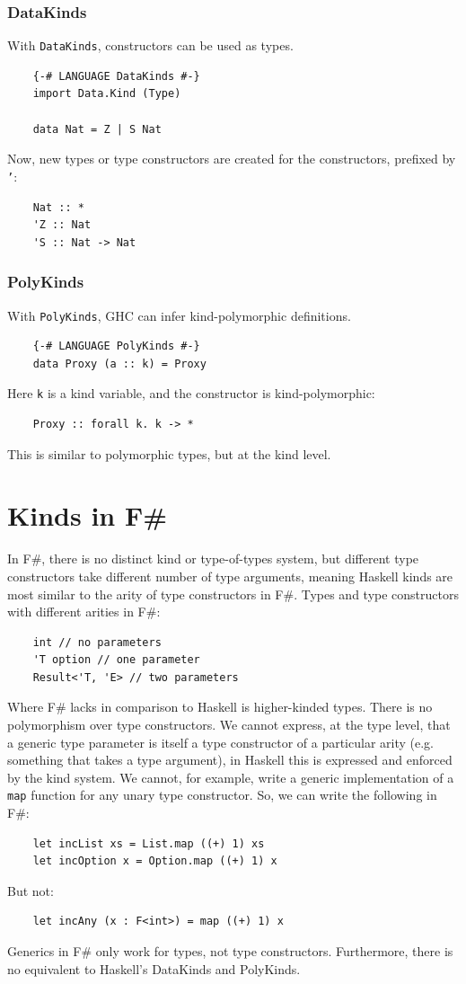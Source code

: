 \documentclass[12pt,oneside,a4paper]{article}
\begin{document}
\subsubsection*{DataKinds}
With \texttt{DataKinds}, constructors can be used as types.
\begin{lstlisting}
    {-# LANGUAGE DataKinds #-}
    import Data.Kind (Type)

    data Nat = Z | S Nat
\end{lstlisting}
Now, new types or type constructors are created for the constructors, prefixed by \texttt{'}:
\begin{lstlisting}
    Nat :: *
    'Z :: Nat
    'S :: Nat -> Nat
\end{lstlisting}
\subsubsection*{PolyKinds}
With \texttt{PolyKinds}, GHC can infer kind-polymorphic definitions.
\begin{lstlisting}
    {-# LANGUAGE PolyKinds #-}
    data Proxy (a :: k) = Proxy
\end{lstlisting}
Here \texttt{k} is a kind variable, and the constructor is kind-polymorphic:
\begin{lstlisting}
    Proxy :: forall k. k -> *
\end{lstlisting}
This is similar to polymorphic types, but at the kind level.


\section{Kinds in F\#}
In F\#, there is no distinct kind or type-of-types system, but different type constructors take different number of type arguments, meaning Haskell kinds are most similar to the arity of type constructors in F\#. Types and type constructors with different arities in F\#:
\begin{lstlisting}
    int // no parameters
    'T option // one parameter
    Result<'T, 'E> // two parameters
\end{lstlisting}
Where F\# lacks in comparison to Haskell is higher-kinded types. There is no polymorphism over type constructors. We cannot express, at the type level, that a generic type parameter is itself a type constructor of a particular arity (e.g. something that takes a type argument), in Haskell this is expressed and enforced by the kind system. We cannot, for example, write a generic implementation of a \texttt{map} function for any unary type constructor. So, we can write the following in F\#:
\begin{lstlisting}
    let incList xs = List.map ((+) 1) xs
    let incOption x = Option.map ((+) 1) x
\end{lstlisting}
But not:
\begin{lstlisting}
    let incAny (x : F<int>) = map ((+) 1) x
\end{lstlisting}
Generics in F\# only work for types, not type constructors. Furthermore, there is no equivalent to Haskell's DataKinds and PolyKinds.
\end{document}
